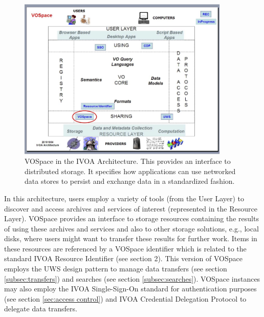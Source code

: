 \documentclass[11pt,a4paper]{ivoa}
\begin{document}
\begin{figure}
\centering


\includegraphics[width=0.9\textwidth]{archdiag.png}
\caption{VOSpace in the IVOA Architecture. This provides an interface to distributed storage. It specifies how applications can use networked data stores to persist and exchange data in a standardized fashion.}
\label{fig:archdiag}
\end{figure}

In this architecture, users employ a variety of tools (from the User Layer) to discover and access archives and services of interest (represented in the Resource Layer). VOSpace provides an interface to storage resources containing the results of using these archives and services and also to other storage solutions, e.g., local disks, where users might want to transfer these results for further work. Items in these resources are referenced by a VOSpace identifier which is related to the standard IVOA Resource Identifier (see section 2). This version of VOSpace employs the UWS design pattern \citep{std:UWS} to manage data transfers (see section \ref{subsec:transfers}) and searches (see section \ref{subsec:searches}). VOSpace instances may also employ the IVOA Single-Sign-On standard \citep{std:SSOAUTH} for authentication purposes (see section \ref{sec:access control}) and IVOA Credential Delegation Protocol \citep{std:CDP} to delegate data transfers.
\end{document}
